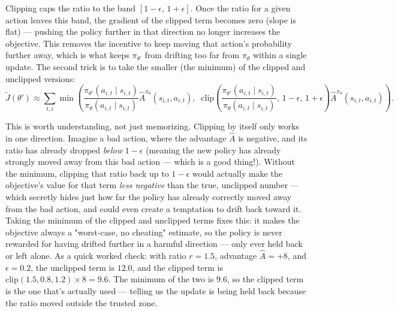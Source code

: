 \documentclass[11pt]{article}
\begin{document}
Clipping caps the ratio to the band $[1-\epsilon,\,1+\epsilon]$. Once the ratio for a given action leaves this band, the gradient of the clipped term becomes zero (slope is flat) — pushing the policy further in that direction no longer increases the objective. This removes the incentive to keep moving that action's probability further away, which is what keeps $\pi_{\theta'}$ from drifting too far from $\pi_\theta$ within a single update.
The second trick is to take the smaller (the minimum) of the clipped and unclipped versions:
$$\tilde J(\theta') \approx \sum_{t,i} \min\!\left(\frac{\pi_{\theta'}(a_{i,t}\mid s_{i,t})}{\pi_\theta(a_{i,t}\mid s_{i,t})}\hat A^{\pi_\theta}(s_{i,t},a_{i,t}),\;\; \text{clip}\!\left(\frac{\pi_{\theta'}(a_{i,t}\mid s_{i,t})}{\pi_\theta(a_{i,t}\mid s_{i,t})},\,1-\epsilon,\,1+\epsilon\right)\hat A^{\pi_\theta}(s_{i,t},a_{i,t})\right).$$

This is worth understanding, not just memorizing. Clipping by itself only works in one direction. Imagine a bad action, where the advantage $\hat A$ is negative, and its ratio has already dropped \emph{below} $1-\epsilon$ (meaning the new policy has already strongly moved away from this bad action --- which is a good thing!). Without the minimum, clipping that ratio back up to $1-\epsilon$ would actually make the objective's value for that term \emph{less negative} than the true, unclipped number --- which secretly hides just how far the policy has already correctly moved away from the bad action, and could even create a temptation to drift back toward it. Taking the minimum of the clipped and unclipped terms fixes this: it makes the objective always a "worst-case, no cheating" estimate, so the policy is never rewarded for having drifted further in a harmful direction --- only ever held back or left alone. As a quick worked check: with ratio $r=1.5$, advantage $\hat A=+8$, and $\epsilon=0.2$, the unclipped term is $12.0$, and the clipped term is $\text{clip}(1.5,0.8,1.2)\times 8 = 9.6$. The minimum of the two is $9.6$, so the clipped term is the one that's actually used --- telling us the update is being held back because the ratio moved outside the trusted zone.
\end{document}
